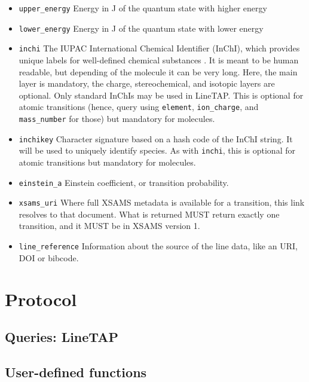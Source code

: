 \documentclass[11pt,a4paper]{ivoa}
\begin{document}
\begin{itemize}
\item \texttt{upper\_energy} Energy  in J of the quantum state
with higher energy

\item \texttt{lower\_energy} Energy  in J of the quantum state
with lower energy

\item \texttt{inchi} The IUPAC International Chemical Identifier
(InChI), which  provides unique labels for well-defined chemical
substances \citep{INCHI}. It is meant to be human readable, but
depending of the molecule it can be very long.  Here, the main layer is
mandatory, the charge, stereochemical, and isotopic layers are optional.
Only standard InChIs may be used in LineTAP.  This is optional for
atomic transitions (hence, query using \texttt{element},
\texttt{ion\_charge}, and \texttt{mass\_number} for those) but mandatory
for molecules.

\item \texttt{inchikey} Character signature based on a hash code of
the InChI string. It will be used to uniquely identify species.  As with
\texttt{inchi}, this is optional for atomic transitions but mandatory
for molecules.

\item \texttt{einstein\_a} Einstein coefficient, or transition probability.

\item \texttt{xsams\_uri}  Where full XSAMS
 metadata is available for a 
transition, this link resolves to that document. What is returned MUST 
return exactly one transition, and it MUST be in XSAMS version 1.

\item \texttt{line\_reference} Information about the source of the line data, 
like an URI, DOI or bibcode.

\end{itemize}


\section{Protocol}
\label{sect:protocol}
\subsection{Queries: LineTAP}

\subsection{User-defined functions}
\label{sect:udfs}
\end{document}
